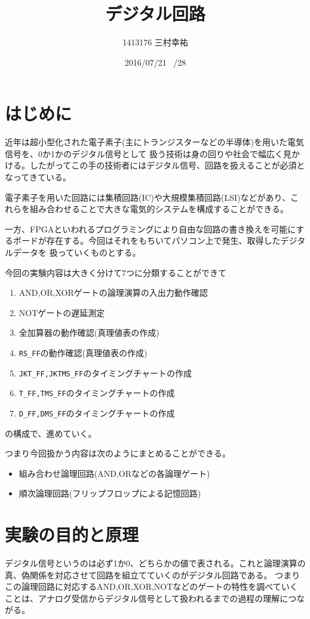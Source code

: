 \documentclass[11pt,a4j]{jsarticle}
\title{デジタル回路}
\author{1413176 三村幸祐}
\date{2016/07/21 \, /28}
\begin{document}
  
  
  \newpage
  
 \section{はじめに}
  近年は超小型化された電子素子(主にトランジスターなどの半導体)を用いた電気信号を、0か1かのデジタル信号として
  扱う技術は身の回りや社会で幅広く見かける。したがってこの手の技術者にはデジタル信号、回路を扱えることが必須となってきている。
  
  電子素子を用いた回路には集積回路(IC)や大規模集積回路(LSI)などがあり、これらを組み合わせることで大きな電気的システムを構成することができる。
  
  一方、FPGAといわれるプログラミングにより自由な回路の書き換えを可能にするボードが存在する。今回はそれをもちいてパソコン上で発生、取得したデジタルデータを
  扱っていくものとする。
  
  今回の実験内容は大きく分けて7つに分類することができて
  \begin{enumerate}
   \item AND,OR,XORゲートの論理演算の入出力動作確認
   \item NOTゲートの遅延測定
   \item 全加算器の動作確認(真理値表の作成)
   \item \verb|RS_FF|の動作確認(真理値表の作成)
   \item \verb|JKT_FF,JKTMS_FF|のタイミングチャートの作成
   \item \verb|T_FF,TMS_FF|のタイミングチャートの作成
   \item \verb|D_FF,DMS_FF|のタイミングチャートの作成
  \end{enumerate}
  の構成で、進めていく。
  
  つまり今回扱かう内容は次のようにまとめることができる。
  \begin{itemize}
   \item 組み合わせ論理回路(AND,ORなどの各論理ゲート)
   \item 順次論理回路(フリップフロップによる記憶回路)
  \end{itemize}


  \newpage
  
 \section{実験の目的と原理}
  デジタル信号というのは必ず1か0、どちらかの値で表される。これと論理演算の真、偽関係を対応させて回路を組立てていくのがデジタル回路である。
  つまりこの論理回路に対応するAND,OR,XOR,NOTなどのゲートの特性を調べていくことは、アナログ受信からデジタル信号として扱われるまでの過程の理解につながる。
\end{document}

